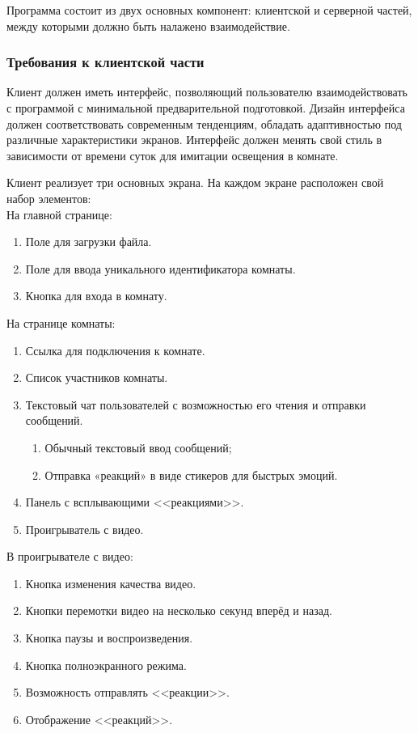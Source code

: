 Программа состоит из двух основных компонент: клиентской и серверной частей, между которыми должно быть налажено
взаимодействие.

\subsubsection{Требования к клиентской части}
Клиент должен иметь интерфейс, позволяющий пользователю взаимодействовать с программой с минимальной предварительной
подготовкой.
Дизайн интерфейса должен соответствовать современным тенденциям, обладать адаптивностью под различные характеристики
экранов.
Интерфейс должен менять свой стиль в зависимости от времени суток для имитации освещения в комнате.

Клиент реализует три основных экрана.
На каждом экране расположен свой набор элементов:\\

На главной странице:
\begin{enumerate}[noitemsep]
    \item Поле для загрузки файла.
    \item Поле для ввода уникального идентификатора комнаты.
    \item Кнопка для входа в комнату.
\end{enumerate}

На странице комнаты:
\begin{enumerate}[noitemsep]
    \item Ссылка для подключения к комнате.
    \item Список участников комнаты.
    \item Текстовый чат пользователей с возможностью его чтения и отправки сообщений.
    \begin{enumerate}
        \item Обычный текстовый ввод сообщений;
        \item Отправка «реакций» в виде стикеров для быстрых эмоций.
    \end{enumerate}
    \item Панель с всплывающими <<реакциями>>.
    \item Проигрыватель с видео.
\end{enumerate}

В проигрывателе с видео:
\begin{enumerate}[noitemsep]
    \item Кнопка изменения качества видео.
    \item Кнопки перемотки видео на несколько секунд вперёд и назад.
    \item Кнопка паузы и воспроизведения.
    \item Кнопка полноэкранного режима.
    \item Возможность отправлять <<реакции>>.
    \item Отображение <<реакций>>.
\end{enumerate}

